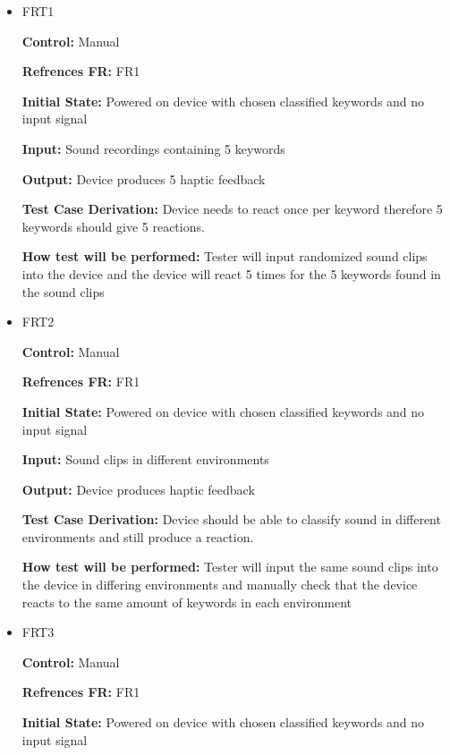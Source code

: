 \documentclass[12pt, titlepage]{article}
\begin{document}
\begin{itemize}

\item{FRT1}

\textbf{Control:} Manual

\textbf{Refrences FR:} FR1 					

\textbf{Initial State:} Powered on device with chosen classified keywords and no input signal
					
\textbf{Input:} Sound recordings containing 5 keywords
					
\textbf{Output:} Device produces 5 haptic feedback

\textbf{Test Case Derivation:} Device needs to react once per keyword therefore 5 keywords should give 5 reactions.
					
\textbf{How test will be performed:} Tester will input randomized sound clips into the device and the device will react 5 times for the 5 keywords found in the sound clips
 

\item{FRT2}

\textbf{Control:} Manual

\textbf{Refrences FR:} FR1 					

\textbf{Initial State:} Powered on device with chosen classified keywords and no input signal 
					
\textbf{Input:} Sound clips in different environments
					
\textbf{Output:} Device produces haptic feedback

\textbf{Test Case Derivation:} Device should be able to classify sound in different environments and still produce a reaction.
					
\textbf{How test will be performed:} Tester will input the same sound clips into the device in differing environments and manually check that the device reacts to the same amount of keywords in each environment 

\item{FRT3}

\textbf{Control:} Manual

\textbf{Refrences FR:} FR1 					

\textbf{Initial State:} Powered on device with chosen classified keywords and no input signal 
					

\end{itemize}
\end{document}
